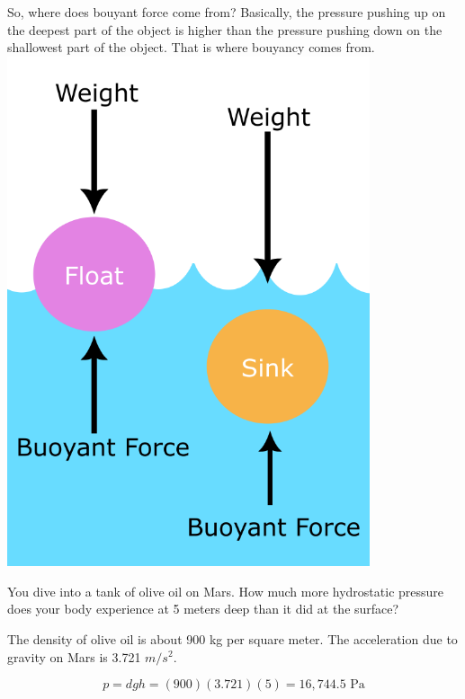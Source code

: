 So, where does bouyant force come from? Basically, the pressure pushing up on the
deepest part of the object is higher than the pressure pushing down on
the shallowest part of the object. That is where bouyancy comes from.
\includegraphics[width=0.8\textwidth]{Buoyancy_Diagram.png}

\begin{Exercise}[title={Hydrostatic Pressure}, label=mars_pressure]

  You dive into a tank of olive oil on Mars. How much more
  hydrostatic pressure does your body experience at 5 meters deep than
  it did at the surface?

  The density of olive oil is about 900 kg per square meter. The
  acceleration due to gravity on Mars is 3.721 $m/s^2$.
  
\end{Exercise}
\begin{Answer}[ref=mars_pressure]
$$p = d g h = (900)(3.721)(5) = 16,744.5 \text{ Pa}$$
\end{Answer}

